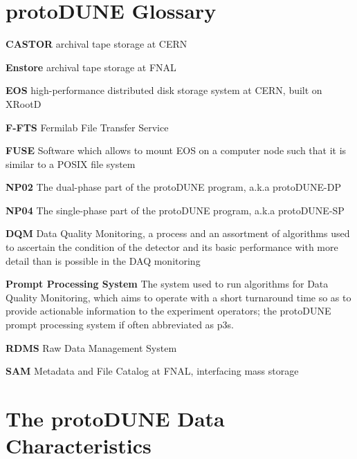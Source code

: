 \documentclass[12pt]{article}
\newcommand{\pd}{protoDUNE\xspace}
\begin{document}
\section{\pd Glossary}
\begin{description}

\item{\textbf{CASTOR}} archival tape storage at CERN

\item{\textbf{Enstore}} archival tape storage at FNAL

\item{\textbf{EOS}}  high-performance distributed disk storage system at CERN, built on XRootD

\item{\textbf{F-FTS}} Fermilab File Transfer Service

\item{\textbf{FUSE}} Software which allows to mount EOS on a computer node such that it is similar to a POSIX file system

\item{\textbf{NP02}} The dual-phase part of the \pd program, a.k.a \pd-DP

\item{\textbf{NP04}} The single-phase part of the \pd program, a.k.a \pd-SP

\item{\textbf{DQM}} Data Quality Monitoring, a process and an assortment of algorithms used to ascertain
the condition of the detector and its basic performance with more detail than is possible in the DAQ monitoring

\item{\textbf{Prompt Processing System}} The system used to run algorithms for Data Quality Monitoring, which
aims to operate with a short turnaround time so as to provide actionable information to the experiment operators;
the \pd prompt processing system if often abbreviated as p3s.

\item{\textbf{RDMS}} Raw Data Management System

\item{\textbf{SAM}} Metadata and File Catalog at FNAL, interfacing mass storage

\end{description}


\section{The protoDUNE Data Characteristics}
\end{document}
